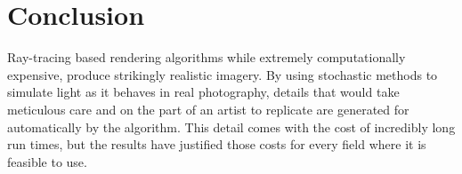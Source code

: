 \documentclass[10pt]{IEEEtran}
\begin{document}
\section*{Conclusion}

Ray-tracing based rendering algorithms while extremely computationally expensive, produce strikingly
realistic imagery. By using stochastic methods to simulate light as it behaves in real photography,
details that would take meticulous care and on the part of an artist to replicate are generated for
automatically by the algorithm. This detail comes with the cost of incredibly long run times, but
the results have justified those costs for every field where it is feasible to use.

\printbibliography

\end{document}
